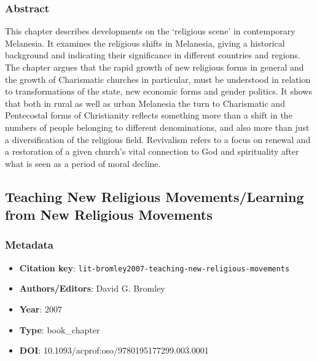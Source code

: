 \subsubsection*{Abstract}
This chapter describes developments on the ‘religious scene’ in contemporary Melanesia. It examines the religious shifts in Melanesia, giving a historical background and indicating their significance in different countries and regions. The chapter argues that the rapid growth of new religious forms in general and the growth of Charismatic churches in particular, must be understood in relation to transformations of the state, new economic forms and gender politics. It shows that both in rural as well as urban Melanesia the turn to Charismatic and Pentecostal forms of Christianity reflects something more than a shift in the numbers of people belonging to different denominations, and also more than just a diversification of the religious field. Revivalism refers to a focus on renewal and a restoration of a given church’s vital connection to God and spirituality after what is seen as a period of moral decline.

\subsection{Teaching New Religious Movements/Learning from New Religious Movements}\label{lit:lit-bromley2007-teaching-new-religious-movements}
\subsubsection*{Metadata}
\begin{itemize}
  \item \textbf{Citation key}: \texttt{lit-bromley2007-teaching-new-religious-movements}
  \item \textbf{Authors/Editors}: David G. Bromley
  \item \textbf{Year}: 2007
  \item \textbf{Type}: book\_chapter
  \item \textbf{DOI}: 10.1093/acprof:oso/9780195177299.003.0001
\end{itemize}
